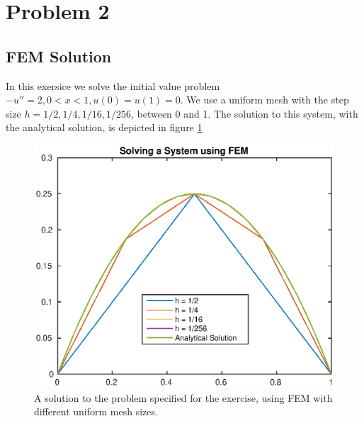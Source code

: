 \documentclass[11pt]{article}
\begin{document}
\newpage
\section{Problem 2}
\subsection{FEM Solution}
In this exersice we solve the initial value problem $-u'' = 2,0<x<1,u(0)=u(1)=0$. We use a uniform mesh with the step size $h = 1/2, 1/4, 1/16, 1/256$, between 0 and 1. The solution to this system, with the analytical solution, is depicted in figure \ref{fig:fem}
\begin{figure}[H]
	\centering
	\includegraphics[width=1\textwidth]{../ex2/fem}
	\caption{A solution to the problem specified for the exercise, using FEM with different uniform mesh sizes.}
	\label{fig:fem}
\end{figure}
\end{document}
